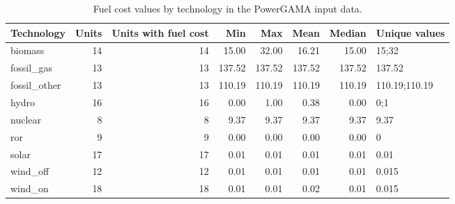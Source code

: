 \begin{table}
\caption{Fuel cost values by technology in the PowerGAMA input data.}
\label{tab:fuel_costs}
\begin{tabular}{lrrrrrrl}
\toprule
Technology & Units & Units with fuel cost & Min & Max & Mean & Median & Unique values \\
\midrule
biomass & 14 & 14 & 15.00 & 32.00 & 16.21 & 15.00 & 15;32 \\
fossil\_gas & 13 & 13 & 137.52 & 137.52 & 137.52 & 137.52 & 137.52 \\
fossil\_other & 13 & 13 & 110.19 & 110.19 & 110.19 & 110.19 & 110.19;110.19 \\
hydro & 16 & 16 & 0.00 & 1.00 & 0.38 & 0.00 & 0;1 \\
nuclear & 8 & 8 & 9.37 & 9.37 & 9.37 & 9.37 & 9.37 \\
ror & 9 & 9 & 0.00 & 0.00 & 0.00 & 0.00 & 0 \\
solar & 17 & 17 & 0.01 & 0.01 & 0.01 & 0.01 & 0.01 \\
wind\_off & 12 & 12 & 0.01 & 0.01 & 0.01 & 0.01 & 0.015 \\
wind\_on & 18 & 18 & 0.01 & 0.01 & 0.02 & 0.01 & 0.015 \\
\bottomrule
\end{tabular}
\end{table}
